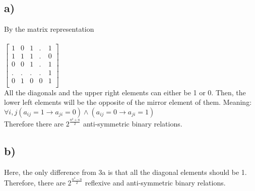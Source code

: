 \documentclass[11pt]{article}
\begin{document}
\subsection*{a)}
	By the matrix representation \\
	\\
	$ \begin{bmatrix}
	1 & 0 & 1 & . & 1 \\
	1 & 1 & 1 & . & 0 \\
	0 & 0 & 1 & . & 1 \\
	. & . & . & . & 1 \\
	0 & 1 & 0 & 0 & 1 \\
	\end{bmatrix} $
	\\
	All the diagonals and the upper right elements can either be 1 or 0. Then, the lower left elements will be the opposite of the mirror element of them. Meaning: \\
	$ \forall i, j (a_{ij} = 1 \rightarrow a_{ji} = 0) \wedge (a_{ij} = 0 \rightarrow a_{ji} = 1) $ \\
	Therefore there are $ 2^{\frac{n^2 + n}{2}} $ anti-symmetric binary relations. \\

\subsection*{b)}
	Here, the only difference from 3a is that all the diagonal elements should be 1. Therefore, there are $ 2^{\frac{n^2 - n}{2}} $ reflexive and anti-symmetric binary relations. \\
\end{document}
